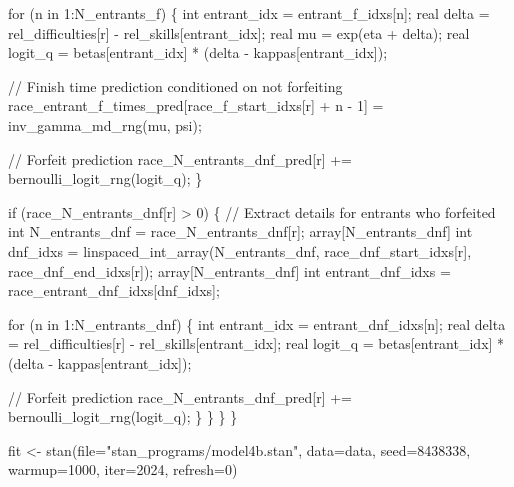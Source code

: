 \documentclass[
  letterpaper,
  DIV=11,
  numbers=noendperiod]{scrartcl}
\newenvironment{Shaded}{\begin{snugshade}}{\end{snugshade}}
\newcommand{\AttributeTok}[1]{\textcolor[rgb]{0.40,0.45,0.13}{#1}}
\newcommand{\CommentTok}[1]{\textcolor[rgb]{0.37,0.37,0.37}{#1}}
\newcommand{\ControlFlowTok}[1]{\textcolor[rgb]{0.00,0.23,0.31}{#1}}
\newcommand{\DataTypeTok}[1]{\textcolor[rgb]{0.68,0.00,0.00}{#1}}
\newcommand{\DecValTok}[1]{\textcolor[rgb]{0.68,0.00,0.00}{#1}}
\newcommand{\FunctionTok}[1]{\textcolor[rgb]{0.28,0.35,0.67}{#1}}
\newcommand{\NormalTok}[1]{\textcolor[rgb]{0.00,0.23,0.31}{#1}}
\newcommand{\OtherTok}[1]{\textcolor[rgb]{0.00,0.23,0.31}{#1}}
\newcommand{\StringTok}[1]{\textcolor[rgb]{0.13,0.47,0.30}{#1}}
\begin{document}
\begin{codelisting}
\begin{Shaded}
\begin{Highlighting}[]
    \ControlFlowTok{for}\NormalTok{ (n }\ControlFlowTok{in} \DecValTok{1}\NormalTok{:N\_entrants\_f) \{}
      \DataTypeTok{int}\NormalTok{ entrant\_idx = entrant\_f\_idxs[n];}
      \DataTypeTok{real}\NormalTok{ delta = rel\_difficulties[r] {-} rel\_skills[entrant\_idx];}
      \DataTypeTok{real}\NormalTok{ mu = exp(eta + delta);}
      \DataTypeTok{real}\NormalTok{ logit\_q = betas[entrant\_idx] * (delta {-} kappas[entrant\_idx]);}

      \CommentTok{// Finish time prediction conditioned on not forfeiting}
\NormalTok{      race\_entrant\_f\_times\_pred[race\_f\_start\_idxs[r] + n {-} }\DecValTok{1}\NormalTok{]}
\NormalTok{        = inv\_gamma\_md\_rng(mu, psi);}

      \CommentTok{// Forfeit prediction}
\NormalTok{      race\_N\_entrants\_dnf\_pred[r] += bernoulli\_logit\_rng(logit\_q);}
\NormalTok{    \}}

    \ControlFlowTok{if}\NormalTok{ (race\_N\_entrants\_dnf[r] \textgreater{} }\DecValTok{0}\NormalTok{) \{}
      \CommentTok{// Extract details for entrants who forfeited}
      \DataTypeTok{int}\NormalTok{ N\_entrants\_dnf = race\_N\_entrants\_dnf[r];}
      \DataTypeTok{array}\NormalTok{[N\_entrants\_dnf]}
        \DataTypeTok{int}\NormalTok{ dnf\_idxs = linspaced\_int\_array(N\_entrants\_dnf,}
\NormalTok{                                           race\_dnf\_start\_idxs[r],}
\NormalTok{                                           race\_dnf\_end\_idxs[r]);}
      \DataTypeTok{array}\NormalTok{[N\_entrants\_dnf]}
        \DataTypeTok{int}\NormalTok{ entrant\_dnf\_idxs = race\_entrant\_dnf\_idxs[dnf\_idxs];}

      \ControlFlowTok{for}\NormalTok{ (n }\ControlFlowTok{in} \DecValTok{1}\NormalTok{:N\_entrants\_dnf) \{}
        \DataTypeTok{int}\NormalTok{ entrant\_idx = entrant\_dnf\_idxs[n];}
        \DataTypeTok{real}\NormalTok{ delta = rel\_difficulties[r] {-} rel\_skills[entrant\_idx];}
        \DataTypeTok{real}\NormalTok{ logit\_q = betas[entrant\_idx] * (delta {-} kappas[entrant\_idx]);}

        \CommentTok{// Forfeit prediction}
\NormalTok{        race\_N\_entrants\_dnf\_pred[r] += bernoulli\_logit\_rng(logit\_q);}
\NormalTok{      \}}
\NormalTok{    \}}
\NormalTok{  \}}
\NormalTok{\}}
\end{Highlighting}
\end{Shaded}

\end{codelisting}

\begin{Shaded}
\begin{Highlighting}[]
\NormalTok{fit }\OtherTok{\textless{}{-}} \FunctionTok{stan}\NormalTok{(}\AttributeTok{file=}\StringTok{"stan\_programs/model4b.stan"}\NormalTok{,}
            \AttributeTok{data=}\NormalTok{data, }\AttributeTok{seed=}\DecValTok{8438338}\NormalTok{,}
            \AttributeTok{warmup=}\DecValTok{1000}\NormalTok{, }\AttributeTok{iter=}\DecValTok{2024}\NormalTok{, }\AttributeTok{refresh=}\DecValTok{0}\NormalTok{)}
\end{Highlighting}
\end{Shaded}
\end{document}
